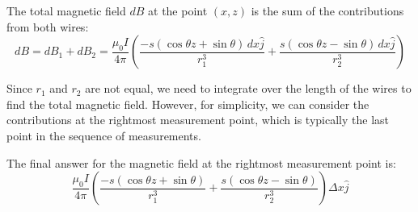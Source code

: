 The total magnetic field \( dB \) at the point \( (x, z) \) is the sum of the contributions from both wires:
\[ dB = dB_1 + dB_2 = \frac{\mu_0 I}{4\pi} \left( \frac{-s (\cos \theta z + \sin \theta) \, dx \hat{j}}{r_1^3} + \frac{s (\cos \theta z - \sin \theta) \, dx \hat{j}}{r_2^3} \right) \]

Since \( r_1 \) and \( r_2 \) are not equal, we need to integrate over the length of the wires to find the total magnetic field. However, for simplicity, we can consider the contributions at the rightmost measurement point, which is typically the last point in the sequence of measurements.

The final answer for the magnetic field at the rightmost measurement point is:
\[ \boxed{\frac{\mu_0 I}{4\pi} \left( \frac{-s (\cos \theta z + \sin \theta)}{r_1^3} + \frac{s (\cos \theta z - \sin \theta)}{r_2^3} \right) \Delta x \hat{j}} \]